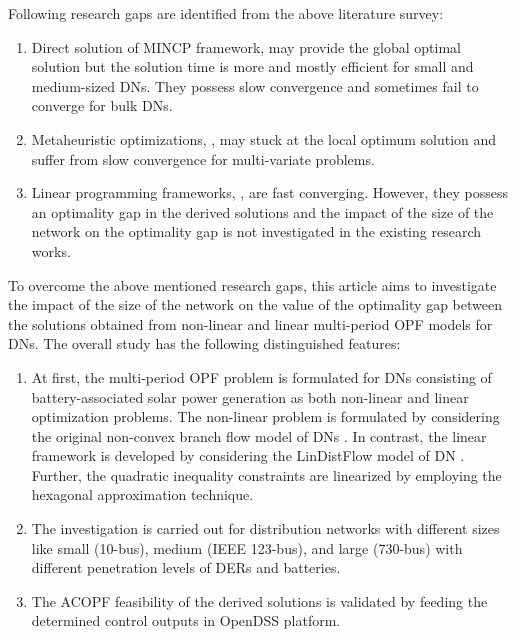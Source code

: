 \documentclass{article}
\begin{document}
Following research gaps are identified from the above literature survey:
\begin{enumerate}
    \item Direct solution of MINCP framework, \cite{Gabas, Safdarian, Jha} may provide the global optimal solution but the solution time is more and mostly efficient for small and medium-sized DNs. They possess slow convergence and sometimes fail to converge for bulk DNs.
    \item Metaheuristic optimizations, \cite{Mohapatra, Padilha-Feltrin, Liu}, may stuck at the local optimum solution and suffer from slow convergence for multi-variate problems.
    \item Linear programming frameworks, \cite{Li, Lei, spaul, Yang, Vaishya}, are fast converging. However, they possess an optimality gap in the derived solutions and the impact of the size of the network on the optimality gap is not investigated in the existing research works.
\end{enumerate}
To overcome the above mentioned research gaps, this article aims to investigate the impact of the size of the network on the value of the optimality gap between the solutions obtained from non-linear and linear multi-period OPF models for DNs. The overall study has the following distinguished features:
\begin{enumerate}
    \item At first, the multi-period OPF problem is formulated for DNs consisting of battery-associated solar power generation as both non-linear and linear optimization problems. The non-linear problem is formulated by considering the original non-convex branch flow model of DNs \cite{Farivar1}. In contrast, the linear framework is developed by considering the LinDistFlow model of DN \cite{Gan}. Further, the quadratic inequality constraints are linearized by employing the hexagonal approximation technique. 
    \item The investigation is carried out for distribution networks with different sizes like small (10-bus), medium (IEEE 123-bus), and large (730-bus) with different penetration levels of DERs and batteries. 
    \item The ACOPF feasibility of the derived solutions is validated by feeding the determined control outputs in OpenDSS platform. 
\end{enumerate}
\end{document}
